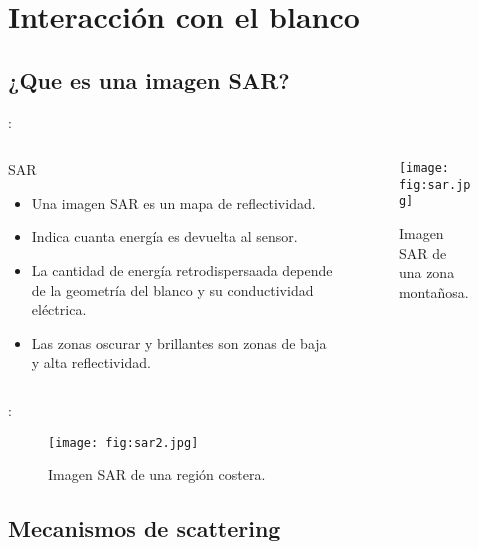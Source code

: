 \section{Interacción con el blanco}
\subsection{¿Que es una imagen SAR?}
\begin{frame}{\secname : \subsecname}
  \begin{columns}[t]
    \begin{column}{0.5\textwidth}
     \begin{block}{SAR}
       \begin{itemize}
         \item Una imagen SAR es un mapa de reflectividad.
         \item Indica cuanta energía es devuelta al sensor.
         \item La cantidad de energía retrodispersaada depende de la geometría del blanco y su conductividad eléctrica.
         \item Las zonas oscurar y brillantes son zonas de baja y alta reflectividad.
       \end{itemize}
     \end{block}
    \end{column}
    \begin{column}{0.5\textwidth}  %
        \begin{figure}
          \centering
          \texttt{[image: fig:sar.jpg]}
          \caption{Imagen SAR de una zona montañosa.}
          \label{}
        \end{figure}
    \end{column}
    \end{columns}
\end{frame}

\begin{frame}{\secname : \subsecname}
    \begin{figure}
      \centering
      \texttt{[image: fig:sar2.jpg]}
      \caption{Imagen SAR de una región costera.}
      \label{}
    \end{figure}
\end{frame}

\subsection{Mecanismos de scattering}

